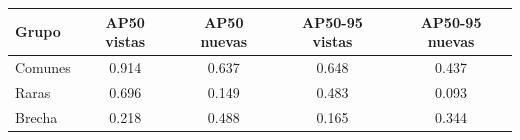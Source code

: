 \begin{tabular}{lcccc}
\hline
Grupo & AP50 vistas & AP50 nuevas & AP50-95 vistas & AP50-95 nuevas \\
\hline
Comunes & 0.914 & 0.637 & 0.648 & 0.437 \\
Raras & 0.696 & 0.149 & 0.483 & 0.093 \\
Brecha & 0.218 & 0.488 & 0.165 & 0.344 \\
\hline
\end{tabular}
